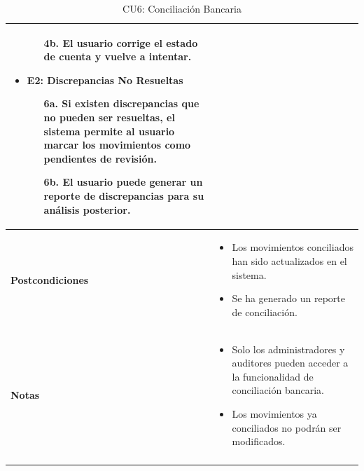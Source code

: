 \documentclass{article}
\begin{document}
\begin{longtable}{|l|p{10cm}|}
\begin{itemize}
\begin{enumerate}
        \item[4b.] El usuario corrige el estado de cuenta y vuelve a intentar.
    \end{enumerate}
    \item \textbf{E2: Discrepancias No Resueltas}
    \begin{enumerate}
        \item[6a.] Si existen discrepancias que no pueden ser resueltas, el sistema permite al usuario marcar los movimientos como pendientes de revisión.
        \item[6b.] El usuario puede generar un reporte de discrepancias para su análisis posterior.
    \end{enumerate}
\end{itemize} \\ \hline
\textbf{Postcondiciones} & 
\begin{itemize}
    \item Los movimientos conciliados han sido actualizados en el sistema.
    \item Se ha generado un reporte de conciliación.
\end{itemize} \\ \hline
\textbf{Notas} & 
\begin{itemize}
    \item Solo los administradores y auditores pueden acceder a la funcionalidad de conciliación bancaria.
    \item Los movimientos ya conciliados no podrán ser modificados.
\end{itemize} \\ \hline
\caption{CU6: Conciliación Bancaria}
\end{longtable}

\newpage
\end{document}
